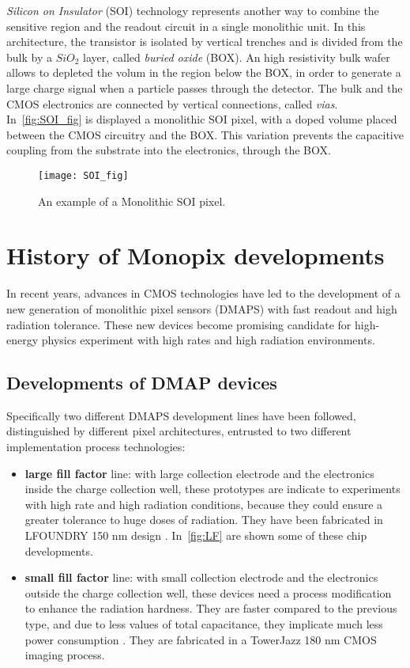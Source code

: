 \textit{Silicon on Insulator} (SOI) technology represents another way to combine the sensitive region and the readout circuit in a single monolithic unit. In this architecture, the transistor is isolated by vertical trenches and is divided from the bulk by a $SiO_{2}$ layer, called \emph{buried oxide} (BOX).
An high resistivity bulk wafer allows to depleted the volum in the region below the BOX, in order to generate a large charge signal when a particle passes through the detector. The bulk and the CMOS electronics are connected by vertical connections, called \textit{vias}. \\
In~\autoref{fig:SOI_fig} is displayed a monolithic SOI pixel, with a doped volume placed between the CMOS circuitry and the BOX. This variation prevents the capacitive coupling from the substrate into the electronics, through the BOX.

\begin{figure}[h!]
\centering
\texttt{[image: SOI\_fig]}
\caption{An example of a Monolithic SOI pixel.}
\label{fig:SOI_fig}
\end{figure}


\section{History of Monopix developments}

In recent years, advances in CMOS technologies have led to the development of a new generation of monolithic pixel sensors (DMAPS) with fast readout and high radiation tolerance. These new devices become promising candidate for high-energy physics experiment with high rates and high radiation environments.


\subsection{Developments of DMAP devices}

Specifically two different DMAPS development lines have been followed, distinguished by different pixel architectures, entrusted to two different implementation process technologies:


\begin{itemize}
\item \textbf{large fill factor} line: with large collection electrode and the electronics inside the charge collection well, these prototypes are indicate to experiments with high rate and high radiation conditions, because they could ensure a greater tolerance to huge doses of radiation. They have been fabricated in LFOUNDRY 150 nm design \cite{Barbero:2019bkw}. In~\autoref{fig:LF} are shown some of these chip developments.
\item \textbf{small fill factor} line: with small collection electrode and the electronics outside the charge collection well, these devices need a process modification to enhance the radiation hardness. They are faster compared to the previous type, and due to less values of total capacitance, they implicate much less power consumption . They are fabricated in a TowerJazz 180 nm CMOS imaging process.
\end{itemize}

